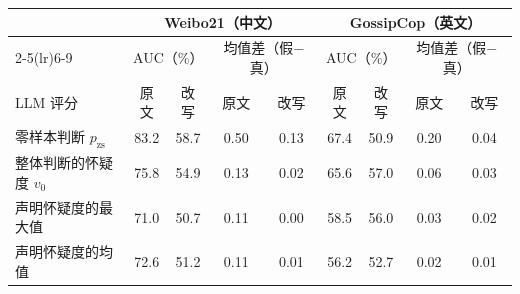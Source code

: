 \begin{tabular}{lcccccccc}
\toprule
 & \multicolumn{4}{c}{Weibo21（中文）} & \multicolumn{4}{c}{GossipCop（英文）} \\
\cmidrule(lr){2-5}\cmidrule(lr){6-9}
 & \multicolumn{2}{c}{AUC（\%）} & \multicolumn{2}{c}{均值差（假$-$真）} & \multicolumn{2}{c}{AUC（\%）} & \multicolumn{2}{c}{均值差（假$-$真）} \\
LLM 评分 & 原文 & 改写 & 原文 & 改写 & 原文 & 改写 & 原文 & 改写 \\
\midrule
零样本判断 $p_{\mathrm{zs}}$ & 83.2 & 58.7 & 0.50 & 0.13 & 67.4 & 50.9 & 0.20 & 0.04 \\
整体判断的怀疑度 $v_0$ & 75.8 & 54.9 & 0.13 & 0.02 & 65.6 & 57.0 & 0.06 & 0.03 \\
声明怀疑度的最大值 & 71.0 & 50.7 & 0.11 & 0.00 & 58.5 & 56.0 & 0.03 & 0.02 \\
声明怀疑度的均值 & 72.6 & 51.2 & 0.11 & 0.01 & 56.2 & 52.7 & 0.02 & 0.01 \\
\bottomrule
\end{tabular}
